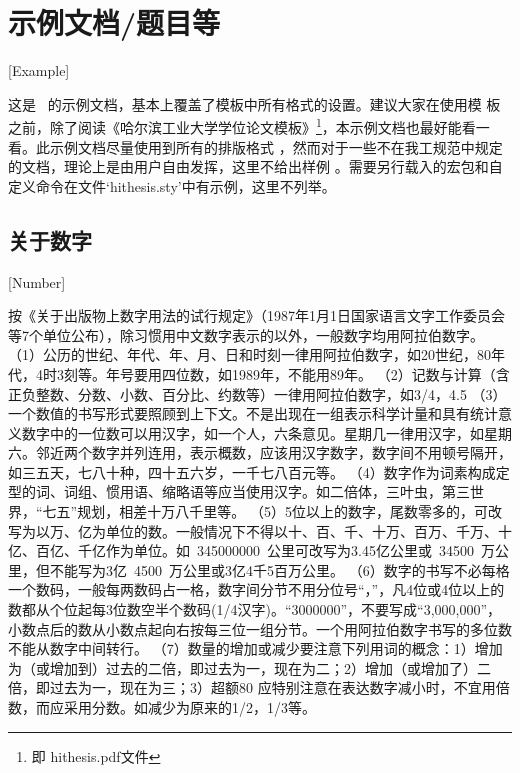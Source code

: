 
\chapter*{示例文档/题目等}[Example]	

这是 \hithesis\ 的示例文档，基本上覆盖了模板中所有格式的设置。建议大家在使用模
板之前，除了阅读《\hithesis\:哈尔滨工业大学学位论文模板》\footnote{即
hithesis.pdf文件}，本示例文档也最好能看一看。此示例文档尽量使用到所有的排版格式
，然而对于一些不在我工规范中规定的文档，理论上是由用户自由发挥，这里不给出样例
。需要另行载入的宏包和自定义命令在文件`hithesis.sty'中有示例，这里不列举。

\section{关于数字}[Number]

按《关于出版物上数字用法的试行规定》（1987年1月1日国家语言文字工作委员会等7个单位公布），除习惯用中文数字表示的以外，一般数字均用阿拉伯数字。
（1）公历的世纪、年代、年、月、日和时刻一律用阿拉伯数字，如20世纪，80年代，4时3刻等。年号要用四位数，如1989年，不能用89年。
（2）记数与计算（含正负整数、分数、小数、百分比、约数等）一律用阿拉伯数字，如3/4，4.5%
（3）一个数值的书写形式要照顾到上下文。不是出现在一组表示科学计量和具有统计意义数字中的一位数可以用汉字，如一个人，六条意见。星期几一律用汉字，如星期六。邻近两个数字并列连用，表示概数，应该用汉字数字，数字间不用顿号隔开，如三五天，七八十种，四十五六岁，一千七八百元等。
（4）数字作为词素构成定型的词、词组、惯用语、缩略语等应当使用汉字。如二倍体，三叶虫，第三世界，“七五”规划，相差十万八千里等。
（5）5位以上的数字，尾数零多的，可改写为以万、亿为单位的数。一般情况下不得以十、百、千、十万、百万、千万、十亿、百亿、千亿作为单位。如~\num{345000000}~公里可改写为3.45亿公里或~\num{34500}~万公里，但不能写为3亿~\num{4500}~万公里或3亿4千5百万公里。
（6）数字的书写不必每格一个数码，一般每两数码占一格，数字间分节不用分位号“，”，凡4位或4位以上的数都从个位起每3位数空半个数码(1/4汉字)。“\num{3000000}”，不要写成“3,000,000”，小数点后的数从小数点起向右按每三位一组分节。一个用阿拉伯数字书写的多位数不能从数字中间转行。
（7）数量的增加或减少要注意下列用词的概念：1）增加为（或增加到）过去的二倍，即过去为一，现在为二；2）增加（或增加了）二倍，即过去为一，现在为三；3）超额80%
应特别注意在表达数字减小时，不宜用倍数，而应采用分数。如减少为原来的1/2，1/3等。


